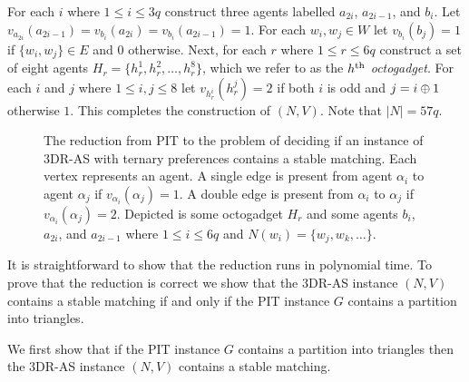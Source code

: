 For each $i$ where $1\leq i \leq 3q$ construct three agents labelled $a_{2i}$, $a_{2i-1}$, and $b_i$. Let $v_{a_{2i}}(a_{2i-1}) = v_{b_i}(a_{2i}) = v_{b_i}(a_{2i-1}) = 1$. For each $w_i, w_j \in W$ let $v_{b_i}(b_j)=1$ if $\{ w_i, w_j \} \in E$ and $0$ otherwise. Next, for each $r$ where $1 \leq r \leq 6q$ construct a set of eight agents $H_r = \{ h_r^1, h_r^2, \dots, h_r^8 \}$, which we refer to as the \emph{$h\textsuperscript{th}$ octogadget}. For each $i$ and $j$ where $1\leq i, j \leq 8$ let $v_{h_r^i}(h_r^j) = 2$ if both $i$ is odd and $j = i \oplus 1$ otherwise $1$.
This completes the construction of $(N, V)$. Note that $|N| = 57q$.

\begin{figure}
    \centering
    
    \vspace*{1mm}
    \caption[The reduction from PIT to the problem of deciding if an instance of 3DR-AS with ternary preferences contains a stable matching]{The reduction from PIT to the problem of deciding if an instance of 3DR-AS with ternary preferences contains a stable matching. Each vertex represents an agent. A single edge is present from agent $\alpha_i$ to agent $\alpha_j$ if $v_{\alpha_i}(\alpha_j) = 1$. A double edge is present from $\alpha_i$ to $\alpha_j$ if $v_{\alpha_i}(\alpha_j) = 2$. Depicted is some octogadget $H_r$ and some agents $b_i$, $a_{2i}$, and $a_{2i - 1}$ where $1\leq i \leq 6q$ and $N(w_i) = \{ w_j, w_k, \dots \}$.}
    \label{fig:threed_sr_as_ternary_symmetric_reduction}
\end{figure}

It is straightforward to show that the reduction runs in polynomial time. To prove that the reduction is correct we show that the 3DR-AS instance $(N, V)$ contains a stable matching if and only if the PIT instance $G$ contains a partition into triangles.

We first show that if the PIT instance $G$ contains a partition into triangles then the 3DR-AS instance $(N, V)$ contains a stable matching.

